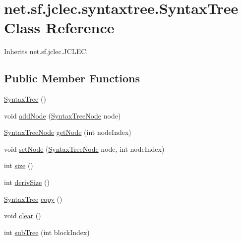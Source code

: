 \hypertarget{classnet_1_1sf_1_1jclec_1_1syntaxtree_1_1_syntax_tree}{\section{net.\-sf.\-jclec.\-syntaxtree.\-Syntax\-Tree Class Reference}
\label{classnet_1_1sf_1_1jclec_1_1syntaxtree_1_1_syntax_tree}
}


Inherits net.\-sf.\-jclec.\-J\-C\-L\-E\-C.

\subsection*{Public Member Functions}
\begin{DoxyCompactItemize}
\item 
\hyperlink{classnet_1_1sf_1_1jclec_1_1syntaxtree_1_1_syntax_tree_a899c18e242325456ddab61a9f46f2c31}{Syntax\-Tree} ()
\item 
void \hyperlink{classnet_1_1sf_1_1jclec_1_1syntaxtree_1_1_syntax_tree_a39b696b1b4288bf78b0fef8201c715cd}{add\-Node} (\hyperlink{classnet_1_1sf_1_1jclec_1_1syntaxtree_1_1_syntax_tree_node}{Syntax\-Tree\-Node} node)
\item 
\hyperlink{classnet_1_1sf_1_1jclec_1_1syntaxtree_1_1_syntax_tree_node}{Syntax\-Tree\-Node} \hyperlink{classnet_1_1sf_1_1jclec_1_1syntaxtree_1_1_syntax_tree_a7746c243d1d5dde1a0bab11a1b558e3e}{get\-Node} (int node\-Index)
\item 
void \hyperlink{classnet_1_1sf_1_1jclec_1_1syntaxtree_1_1_syntax_tree_ae4d5e29bfa8f8e0928e8e6ae2dc8f28f}{set\-Node} (\hyperlink{classnet_1_1sf_1_1jclec_1_1syntaxtree_1_1_syntax_tree_node}{Syntax\-Tree\-Node} node, int node\-Index)
\item 
int \hyperlink{classnet_1_1sf_1_1jclec_1_1syntaxtree_1_1_syntax_tree_aeb48f9ae4696db83f6f987fd72b62377}{size} ()
\item 
int \hyperlink{classnet_1_1sf_1_1jclec_1_1syntaxtree_1_1_syntax_tree_a41c36a1975b721c9fd8bac6ae36fbb08}{deriv\-Size} ()
\item 
\hyperlink{classnet_1_1sf_1_1jclec_1_1syntaxtree_1_1_syntax_tree}{Syntax\-Tree} \hyperlink{classnet_1_1sf_1_1jclec_1_1syntaxtree_1_1_syntax_tree_a1980bd2c9a1c75967b6feb238001510d}{copy} ()
\item 
void \hyperlink{classnet_1_1sf_1_1jclec_1_1syntaxtree_1_1_syntax_tree_ab041275c30b07b99d2b6ee9a0e63ce55}{clear} ()
\item 
int \hyperlink{classnet_1_1sf_1_1jclec_1_1syntaxtree_1_1_syntax_tree_a9870efca9c1a9e31ce3525458faa7ac9}{sub\-Tree} (int block\-Index)

\end{DoxyCompactItemize}
